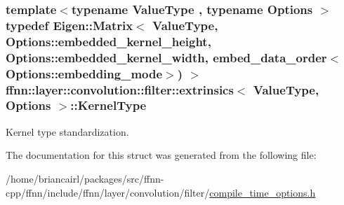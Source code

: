 \hypertarget{structffnn_1_1layer_1_1convolution_1_1filter_1_1extrinsics_a0b687a9387270004cdaa00c19bef26da}{
\subsubsection[{Kernel\-Type}]{\setlength{\rightskip}{0pt plus 5cm}template$<$typename Value\-Type , typename Options $>$ typedef Eigen\-::\-Matrix$<$ Value\-Type, Options\-::embedded\-\_\-kernel\-\_\-height, Options\-::embedded\-\_\-kernel\-\_\-width, {\bf embed\-\_\-data\-\_\-order}$<$Options\-::embedding\-\_\-mode$>$) $>$ {\bf ffnn\-::layer\-::convolution\-::filter\-::extrinsics}$<$ Value\-Type, Options $>$\-::{\bf Kernel\-Type}}}\label{structffnn_1_1layer_1_1convolution_1_1filter_1_1extrinsics_a0b687a9387270004cdaa00c19bef26da}


Kernel type standardization. 



The documentation for this struct was generated from the following file\-:\begin{DoxyCompactItemize}
\item 
/home/briancairl/packages/src/ffnn-\/cpp/ffnn/include/ffnn/layer/convolution/filter/\hyperlink{convolution_2filter_2compile__time__options_8h}{compile\-\_\-time\-\_\-options.\-h}\end{DoxyCompactItemize}

